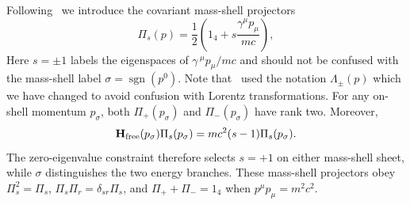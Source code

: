 \documentclass[final,5p,times,twocolumn]{elsarticle}
\begin{document}
Following~\cite{thaller1992dirac,BjorkenDrell1964RQM} we introduce the covariant mass-shell projectors
\begin{equation}
    \Pi_s(p)
    =
    \frac{1}{2}
    \left(
        1_4+s\frac{\gamma^\mu p_\mu}{mc}
    \right),
\end{equation}
Here $s=\pm 1$ labels the eigenspaces of $\gamma\,^\mu p_\mu/mc$ and should not be confused with the mass-shell label $\sigma=\operatorname{sgn}(p^0)$.
Note that~\cite{BjorkenDrell1964RQM} used the notation $\Lambda_\pm(p)$ which we have changed to avoid confusion with Lorentz transformations.
For any on-shell momentum $p_\sigma$, both $\Pi_+(p_\sigma)$ and $\Pi_-(p_\sigma)$ have rank
two. 
Moreover,
\begin{equation}
  \mathbf{H}_{\mathrm{free}}(p_\sigma)\Pi_s(p_\sigma)
  =mc^2(s-1)\Pi_s(p_\sigma).
  \label{eq:projector-kernel}
\end{equation}
The zero-eigenvalue constraint therefore selects $s=+1$ on either
mass-shell sheet, while $\sigma$ distinguishes the two energy
branches.
These mass-shell projectors obey 
    $\Pi_s^2         = \Pi_s$, 
    $\Pi_s\Pi_r      = \delta_{sr}\Pi_s$,   
    and $\Pi_+ + \Pi_-   = 1_4$
when $p^\mu p_\mu=m^2c^2$.
\end{document}
